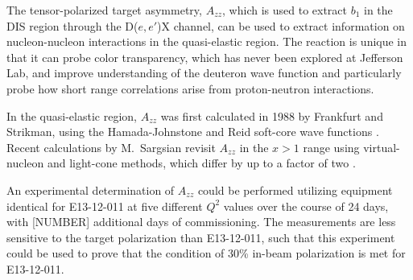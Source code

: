 

The tensor-polarized target asymmetry, $A_{zz}$, which is used to extract $b_1$ in the DIS region through the D($e,e'$)X channel, can be used to extract information on nucleon-nucleon interactions in the quasi-elastic region. The reaction is unique in that it can probe color transparency, which has never been explored at Jefferson Lab, and improve understanding of the deuteron wave function and particularly probe how short range correlations arise from proton-neutron interactions.

In the quasi-elastic region, $A_{zz}$ was first calculated in 1988 by Frankfurt and Strikman, using the Hamada-Johnstone and Reid soft-core wave functions \cite{Frankfurt:1988nt}. Recent calculations by {M.~Sargsian} revisit $A_{zz}$ in the $x>1$ range using virtual-nucleon and light-cone methods, which differ by up to a factor of two \cite{MISAK}.


An experimental determination of $A_{zz}$ could be performed utilizing equipment identical for E13-12-011 at five different $Q^2$ values over the course of 24 days, with [NUMBER] additional days of commissioning. The measurements are less sensitive to the target polarization than E13-12-011, such that this experiment could be used to prove that the condition of 30\% in-beam polarization is met for E13-12-011.
